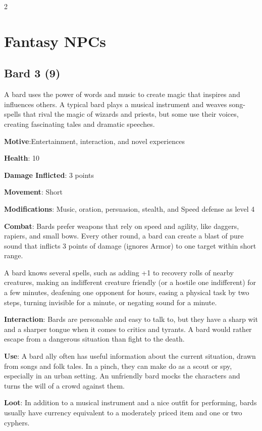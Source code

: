 \begin{multicols}{2}

\section{Fantasy NPCs}

\subsection{Bard 3 (9)}

A bard uses the power of words and music to create magic that inspires and influences others. A typical bard plays a musical instrument and weaves song-spells that rival the magic of wizards and priests, but some use their voices, creating fascinating tales and dramatic speeches. 

\textbf{Motive}:Entertainment, interaction, and novel experiences 

\textbf{Health}: 10 

\textbf{Damage Inflicted}: 3 points 

\textbf{Movement}: Short 

\textbf{Modifications}: Music, oration, persuasion, stealth, and Speed defense as level 4 

\textbf{Combat}: Bards prefer weapons that rely on speed and agility, like daggers, rapiers, and small bows. Every other round, a bard can create a blast of pure sound that inflicts 3 points of damage (ignores Armor) to one target within short range. 

A bard knows several spells, such as adding +1 to recovery rolls of nearby creatures, making an indifferent creature friendly (or a hostile one indifferent) for a few minutes, deafening one opponent for hours, easing a physical task by two steps, turning invisible for a minute, or negating sound for a minute. 

\textbf{Interaction}: Bards are personable and easy to talk to, but they have a sharp wit and a sharper tongue when it comes to critics and tyrants. A bard would rather escape from a dangerous situation than fight to the death. 

\textbf{Use}: A bard ally often has useful information about the current situation, drawn from songs and folk tales. In a pinch, they can make do as a scout or spy, especially in an urban setting. An unfriendly bard mocks the characters and turns the will of a crowd against them. 

\textbf{Loot}: In addition to a musical instrument and a nice outfit for performing, bards usually have currency equivalent to a moderately priced item and one or two cyphers.


\end{multicols}
